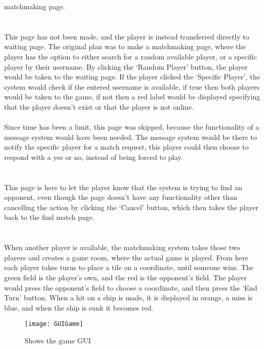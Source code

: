 		  matchmaking page.
\\
\\
\\
This page has not been made, and the player is instead transferred directly
 to waiting page. The original plan was to make a matchmaking page, where the
  player has the option to either search for a random available player, or a
	 specific player by their username. By clicking the ‘Random Player’ button,
	  the player would be taken to the waiting page. If the player clicked the
		‘Specific Player’, the system would check if the entered username is
		available, if true then both players would be taken to the game, if not
		 then a red label would be displayed specifying that the player doesn’t
		 exist or that the player is not online.
\\
\\
Since time has been a limit, this page was skipped, because the functionality
of a message system would have been needed. The message system would be there
 to notify the specific player for a match request, this player could then
 choose to respond with a yes or no, instead of being forced to play.
\\
\\
\\
This page is here to let the player know that the system is trying to find
an opponent, even though the page doesn’t have any functionality other than
 cancelling the action by clicking the ‘Cancel’ button, which then takes the
  player back to the find match page.
\\
\\
\\
When another player is available, the matchmaking system takes those two
 players and creates a game room, where the actual game is played. From here
  each player takes turns to place a tile on a coordinate, until someone wins.
	 The green field is the player's own, and the red is the opponent’s field.
	 The player would press the opponent's field to choose a coordinate, and then
	  press the ‘End Turn’ button. When a hit on a ship is made, it is displayed
		 in orange, a miss is blue, and when the ship is sunk it becomes red.
\begin{figure}[h]
	\centerline{\texttt{[image: GUIGame]}}
	\caption{Shows the game GUI}
\end{figure}
\\
